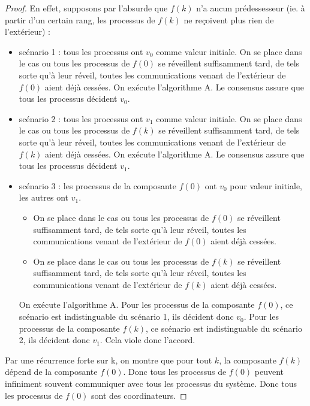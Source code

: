 \documentclass{article}
\begin{document}
\begin{proof}
	En effet, supposons par l'absurde que $f(k)$ n'a aucun prédessesseur (ie. à partir d'un certain rang, les processus de $f(k)$ ne reçoivent plus rien de l'extérieur) :
	\begin{itemize}
		\item scénario 1 : tous les processus ont $v_0$ comme valeur initiale.
			On se place dans le cas ou tous les processus de $f(0)$ se réveillent suffisamment tard,
			de tels sorte qu'à leur réveil, toutes les communications venant de l'extérieur de $f(0)$ aient déjà cessées.
			On exécute l'algorithme A. Le consensus assure que tous les processus décident $v_0$.
		\item scénario 2 : tous les processus ont $v_1$ comme valeur initiale.  On se place dans le cas ou tous les processus de $f(k)$ se réveillent suffisamment tard,
			de tels sorte qu'à leur réveil, toutes les communications venant de l'extérieur de $f(k)$ aient déjà cessées. On exécute l'algorithme A. Le consensus assure que tous les processus décident $v_1$.
		\item scénario 3 : les processus de la  composante $f(0)$ ont $v_0$ pour valeur initiale, les autres ont $v_1$.
			\begin{itemize}
				\item On se place dans le cas ou tous les processus de $f(0)$ se réveillent suffisamment tard,
					de tels sorte qu'à leur réveil, toutes les communications venant de l'extérieur de $f(0)$ aient déjà cessées.
				\item On se place dans le cas ou tous les processus de $f(k)$ se réveillent suffisamment tard,
					de tels sorte qu'à leur réveil, toutes les communications venant de l'extérieur de $f(k)$ aient déjà cessées.
			\end{itemize}
			On exécute l'algorithme A.
			Pour les processus de la composante $f(0)$, ce scénario est indistinguable du scénario 1, ils décident donc $v_0$.
			Pour les processus de la composante $f(k)$, ce scénario est indistinguable du scénario 2, ils décident donc $v_1$.
			Cela viole donc l'accord.
	\end{itemize}

	Par une récurrence forte sur k, on montre que pour tout $k$, la composante $f(k)$ dépend de la composante $f(0)$.
	Donc tous les processus de $f(0)$ peuvent infiniment souvent communiquer avec tous les processus du système. Donc tous les processus de $f(0)$ sont des coordinateurs.


\end{proof}
\end{document}
